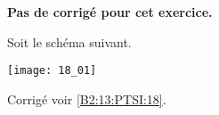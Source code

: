 \normalfalse \difficilefalse \tdifficiletrue
\correctionfalse


\setcounter{numques}{0}
\ifcorrection
\else
\textbf{Pas de corrigé pour cet exercice.}
\fi

\ifprof
\else

Soit le schéma suivant. 
\begin{center}
\texttt{[image: 18\_01]}
\end{center}
\fi



\ifprof
\else
\fi



\ifprof
\else
\begin{flushright}
\footnotesize{Corrigé  voir \ref{B2:13:PTSI:18}.}
\end{flushright}%
\fi